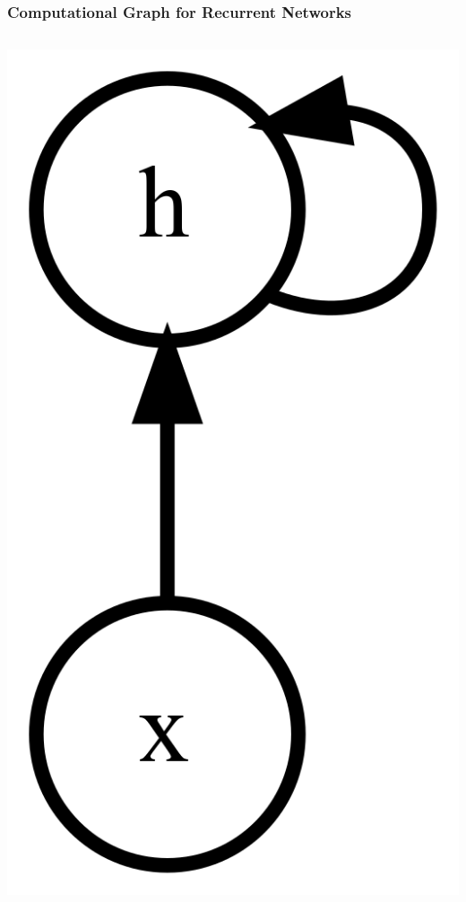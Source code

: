 \documentclass{beamer}
\begin{document}
\begin{frame}
  \frametitle{Computational Graph for Recurrent Networks}
  \begin{columns}
    \begin{column}{0.3\textwidth}
      \begin{center}
        \includegraphics[height=0.6\textheight]{../img/rnn-comp-graph.png}
      \end{center}

\end{column}
\end{columns}
\end{frame}
\end{document}
